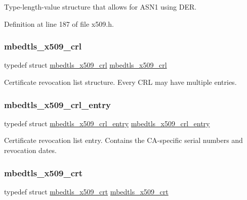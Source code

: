 Type-\/length-\/value structure that allows for A\+S\+N1 using D\+ER. 

Definition at line 187 of file x509.\+h.

\mbox{\label{group__x509__module_ga7957605a0ced963e12880ec9e19874fc}} 
\subsubsection{\texorpdfstring{mbedtls\+\_\+x509\+\_\+crl}{mbedtls\_x509\_crl}}
{\footnotesize\ttfamily typedef struct \mbox{\hyperlink{structmbedtls__x509__crl}{mbedtls\+\_\+x509\+\_\+crl}}
 \mbox{\hyperlink{structmbedtls__x509__crl}{mbedtls\+\_\+x509\+\_\+crl}}}

Certificate revocation list structure. Every C\+RL may have multiple entries. \mbox{\label{group__x509__module_ga1e0c6230061fd501f9d00bd1b09ade33}} 
\subsubsection{\texorpdfstring{mbedtls\+\_\+x509\+\_\+crl\+\_\+entry}{mbedtls\_x509\_crl\_entry}}
{\footnotesize\ttfamily typedef struct \mbox{\hyperlink{structmbedtls__x509__crl__entry}{mbedtls\+\_\+x509\+\_\+crl\+\_\+entry}}
 \mbox{\hyperlink{structmbedtls__x509__crl__entry}{mbedtls\+\_\+x509\+\_\+crl\+\_\+entry}}}

Certificate revocation list entry. Contains the C\+A-\/specific serial numbers and revocation dates. \mbox{\label{group__x509__module_ga836544fec94d5bc02bc97aa87885b9d9}} 
\subsubsection{\texorpdfstring{mbedtls\+\_\+x509\+\_\+crt}{mbedtls\_x509\_crt}}
{\footnotesize\ttfamily typedef struct \mbox{\hyperlink{structmbedtls__x509__crt}{mbedtls\+\_\+x509\+\_\+crt}}
 \mbox{\hyperlink{structmbedtls__x509__crt}{mbedtls\+\_\+x509\+\_\+crt}}}

